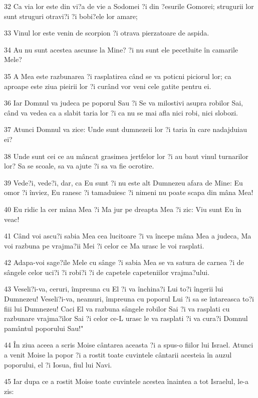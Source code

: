 \par 32 Ca via lor este din vi?a de vie a Sodomei ?i din ?esurile Gomorei; strugurii lor sunt struguri otravi?i ?i bobi?ele lor amare;
\par 33 Vinul lor este venin de scorpion ?i otrava pierzatoare de aspida.
\par 34 Au nu sunt acestea ascunse la Mine? ?i nu sunt ele pecetluite în camarile Mele?
\par 35 A Mea este razbunarea ?i rasplatirea când se va poticni piciorul lor; ca aproape este ziua pieirii lor ?i curând vor veni cele gatite pentru ei.
\par 36 Iar Domnul va judeca pe poporul Sau ?i Se va milostivi asupra robilor Sai, când va vedea ca a slabit taria lor ?i ca nu se mai afla nici robi, nici slobozi.
\par 37 Atunci Domnul va zice: Unde sunt dumnezeii lor ?i taria în care nadajduiau ei?
\par 38 Unde sunt cei ce au mâncat grasimea jertfelor lor ?i au baut vinul turnarilor lor? Sa se scoale, sa va ajute ?i sa va fie ocrotire.
\par 39 Vede?i, vede?i, dar, ca Eu sunt ?i nu este alt Dumnezeu afara de Mine: Eu omor ?i înviez, Eu ranesc ?i tamaduiesc ?i nimeni nu poate scapa din mâna Mea!
\par 40 Eu ridic la cer mâna Mea ?i Ma jur pe dreapta Mea ?i zic: Viu sunt Eu în veac!
\par 41 Când voi ascu?i sabia Mea cea lucitoare ?i va începe mâna Mea a judeca, Ma voi razbuna pe vrajma?ii Mei ?i celor ce Ma urasc le voi rasplati.
\par 42 Adapa-voi sage?ile Mele cu sânge ?i sabia Mea se va satura de carnea ?i de sângele celor uci?i ?i robi?i ?i de capetele capeteniilor vrajma?ului.
\par 43 Veseli?i-va, ceruri, împreuna cu El ?i va închina?i Lui to?i îngerii lui Dumnezeu! Veseli?i-va, neamuri, împreuna cu poporul Lui ?i sa se întareasca to?i fiii lui Dumnezeu! Caci El va razbuna sângele robilor Sai ?i va rasplati cu razbunare vrajma?ilor Sai ?i celor ce-L urasc le va rasplati ?i va cura?i Domnul pamântul poporului Sau!"
\par 44 În ziua aceea a scris Moise cântarea aceasta ?i a spus-o fiilor lui Israel. Atunci a venit Moise la popor ?i a rostit toate cuvintele cântarii acesteia în auzul poporului, el ?i Iosua, fiul lui Navi.
\par 45 Iar dupa ce a rostit Moise toate cuvintele acestea înaintea a tot Israelul, le-a zis:
